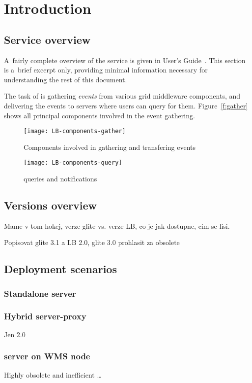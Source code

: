\section{Introduction}

\subsection{Service overview}

A~fairly complete overview of the \LB service is given in \LB User's Guide~\cite{lbug}.
This section is a~brief excerpt only, providing minimal information necessary for
understanding the rest of this document.

The task of \LB is gathering \emph{\LB events} from various grid middleware components,
and delivering the events to \LB servers where users can query for them.
Figure~\ref{f:gather} shows all principal components involved in the event gathering.

\begin{figure}
\centering
\texttt{[image: LB-components-gather]}
\caption{Components involved in gathering and transfering \LB events}
\end{figure}

\begin{figure}
\centering
\texttt{[image: LB-components-query]}
\caption{\LB queries and notifications}
\end{figure}




\subsection{Versions overview}
Mame v tom hokej, verze glite vs. verze LB, co je jak dostupne,
cim se lisi.

Popisovat glite 3.1 a LB 2.0, glite 3.0 prohlasit za obsolete

\subsection{Deployment scenarios}


\subsubsection{Standalone \LB server}

\subsubsection{Hybrid \LB server-proxy}

Jen 2.0

\subsubsection{\LB server on WMS node}
Highly obsolete and inefficient \dots

